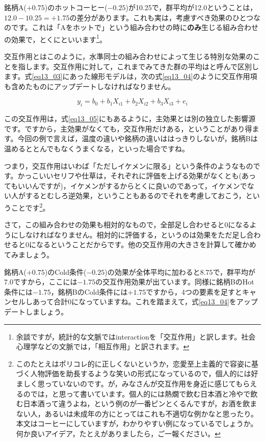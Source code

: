 \documentclass{ltjbook}
\begin{document}
銘柄A($+0.75$)のホットコーヒー($-0.25$)が10.25で，群平均が12.0ということは，$12.0-10.25=+1.75$の差分があります。これも実は，考慮すべき効果のひとつなのです。これは「Aをホットで」という組み合わせの時に\textbf{のみ}生じる組み合わせの効果で，とくにといいます\footnote{余談ですが，統計的な文脈ではinteractionを「交互作用」と訳します。社会心理学などの文脈では，「相互作用」と訳されます。}。

交互作用とはこのように，水準同士の組み合わせによって生じる特別な効果のことを指します。交互作用に対して，これまでみてきた群の平均はと呼んで区別します。式\ref{eq13_03}にあった線形モデルは，次の式\ref{eq13_04}のように交互作用項も含めたものにアップデートしなければなりません。

\begin{equation}
	\label{eq13_05}
	y_i = b_0 + b_1 X_{i1}+ b_2 X_{i2} + b_3 X_{i3} + e_{i}
\end{equation}

この交互作用は，式\ref{eq13_05}にもあるように，主効果とは別の独立した影響源です。ですから，主効果がなくても，交互作用だけある，ということがあり得ます。今回の例で言えば，温度の違いや銘柄の違いははっきりしないが，銘柄Bは温めるととんでもなくうまくなる，といった場合ですね。

つまり，交互作用はいわば「ただしイケメンに限る」という条件のようなものです。かっこいいセリフや仕草は，それぞれに評価を上げる効果がなくとも(あってもいいんですが)，イケメンがするからとくに良いのであって，イケメンでない人がするとむしろ逆効果，ということもあるのでそれを考慮しておこう，ということです\footnote{このたとえはポリコレ的に正しくないというか，恋愛至上主義的で容姿に基づく人物評価を助長するような笑いの形式になっているので，個人的には好ましく思っていないのです。が，みなさんが交互作用を身近に感じてもらえるのでは，と思って書いています。個人的には熱燗で飲む日本酒と冷やで飲む日本酒って違うよね，という例のが一番ピンとくるんですが，お酒を飲まない人，あるいは未成年の方にとってはこれも不適切な例かなと思ったり。本文はコーヒーにしていますが，わかりやすい例になっているでしょうか。何か良いアイデア，たとえがありましたら，ご一報ください。}。

さて，この組み合わせの効果も相対的なもので，全部足し合わせると$0$になるようにしなければなりません。相対的に評価する，というのは効果をただ足し合わせると$0$になるということだからです。他の交互作用の大きさを計算して確かめてみましょう。

銘柄A($+0.75$)のCold条件($-0.25$)の効果が全体平均に加わると$8.75$で，群平均が$7.0$ですから，ここには$-1.75$の交互作用効果が出ています。同様に銘柄BのHot条件には$-1.75$，銘柄BのCold条件には$+1.75$ですから，4つの要素を足すとキャンセルしあって合計$0$になっていますね。これを踏まえて，式\ref{eq13_04}をアップデートしましょう。
\end{document}
